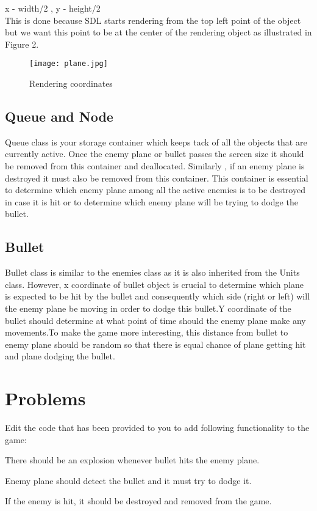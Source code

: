 \documentclass[11pt,fleqn]{book} %
\begin{document}
 x - width/2 , y - height/2\\
 \hfill \break
 This is done because SDL starts rendering from the top left point of the object but we want this point to be at the center of the rendering object as illustrated in Figure 2.
 
 \begin{figure}[h]
 	\centering\texttt{[image: plane.jpg]}
 	\caption{Rendering coordinates}
 \end{figure}
 
 \subsection{Queue and Node}
 Queue class is your storage container which keeps tack of all the objects that are currently active. Once the enemy plane or bullet passes the screen size it should be removed from this container and deallocated. Similarly , if an enemy plane is destroyed it must also be removed from this container. This container is essential to determine which enemy plane among all the active enemies is to be destroyed in case it is hit or to determine which enemy plane will be trying to dodge the bullet. 
 
 \subsection{Bullet}
 Bullet class is similar to the enemies class as it is also inherited from the Units class. However, x coordinate of bullet object is crucial to determine which plane is expected to be hit by the bullet and consequently which side (right or left) will the enemy plane be moving in order to dodge this bullet.Y coordinate of the bullet should determine at what point of time should the enemy plane make any movements.To make the game more interesting, this distance from bullet to enemy plane should be random so that there is equal chance of plane getting hit and plane dodging the bullet.
 
 \section{Problems}
 Edit the code that has been provided to you to add following functionality to the game:\\
 \begin{problem} There should be an explosion whenever bullet hits the enemy plane.\\
 \end{problem}
 \begin{problem} Enemy plane should detect the bullet and it must try to dodge it.\\
 \end{problem}
 \begin{problem} If the enemy is hit, it should be destroyed and removed from the game.
 \end{problem}
 
\end{document}
